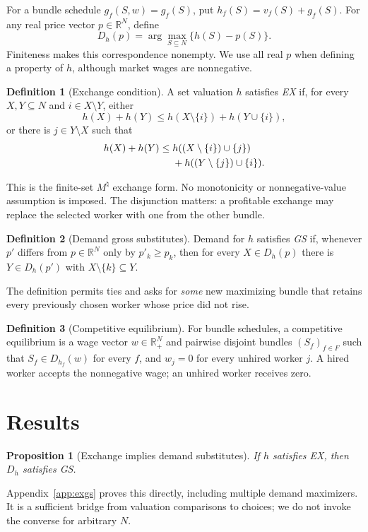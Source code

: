 \documentclass[11pt]{article}
\newtheorem{proposition}{Proposition}
\theoremstyle{definition}
\newtheorem{definition}{Definition}
\theoremstyle{remark}
\numberwithin{equation}{section}
\begin{document}
For a bundle schedule $g_f(S,w)=g_f(S)$, put $h_f(S)=v_f(S)+g_f(S)$. For any real price vector $p\in\mathbb R^N$, define
\begin{equation}
 D_h(p)=\arg\max_{S\subseteq N}\{h(S)-p(S)\}.   \label{eq:demand}
\end{equation}
Finiteness makes this correspondence nonempty. We use all real $p$ when defining a property of $h$, although market wages are nonnegative.

\begin{definition}[Exchange condition]\label{def:ex}
A set valuation $h$ satisfies \emph{EX} if, for every $X,Y\subseteq N$ and $i\in X\setminus Y$, either
\begin{equation}
h(X)+h(Y)\le h(X\setminus\{i\})+h(Y\cup\{i\}), \label{eq:move}
\end{equation}
or there is $j\in Y\setminus X$ such that
\begin{align}
h(X)+h(Y)\le{}&
h((X\setminus\{i\})\cup\{j\})\notag\\
&+h((Y\setminus\{j\})\cup\{i\}).               \label{eq:swap}
\end{align}
\end{definition}
This is the finite-set $M^\natural$ exchange form. No monotonicity or nonnegative-value assumption is imposed. The disjunction matters: a profitable exchange may replace the selected worker with one from the other bundle.

\begin{definition}[Demand gross substitutes]\label{def:gs}
Demand for $h$ satisfies \emph{GS} if, whenever $p'$ differs from $p\in\mathbb R^N$ only by $p'_k\ge p_k$, then for every $X\in D_h(p)$ there is $Y\in D_h(p')$ with $X\setminus\{k\}\subseteq Y$.
\end{definition}
The definition permits ties and asks for \emph{some} new maximizing bundle that retains every previously chosen worker whose price did not rise.

\begin{definition}[Competitive equilibrium]\label{def:eq}
For bundle schedules, a competitive equilibrium is a wage vector $w\in\mathbb R_+^N$ and pairwise disjoint bundles $(S_f)_{f\in F}$ such that $S_f\in D_{h_f}(w)$ for every $f$, and $w_j=0$ for every unhired worker $j$. A hired worker accepts the nonnegative wage; an unhired worker receives zero.
\end{definition}

\section{Results}
\begin{proposition}[Exchange implies demand substitutes]\label{prop:exgs}
If $h$ satisfies EX, then $D_h$ satisfies GS.
\end{proposition}
\noindent Appendix~\ref{app:exgs} proves this directly, including multiple demand maximizers. It is a sufficient bridge from valuation comparisons to choices; we do not invoke the converse for arbitrary $N$.
\end{document}
